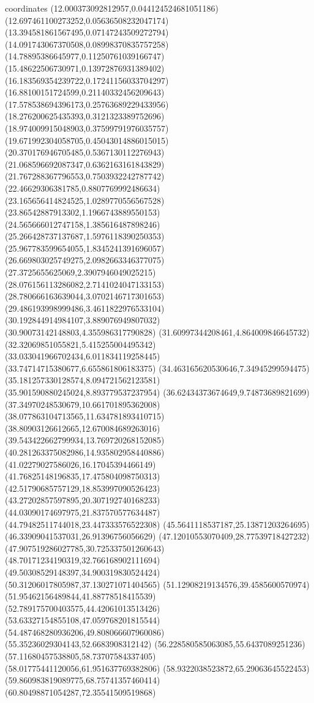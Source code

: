 coordinates {%
(12.000373092812957,0.044124524681051186)
(12.697461100273252,0.05636508232047174)
(13.394581861567495,0.07147243509272794)
(14.091743067370508,0.08998370835757258)
(14.78895386645977,0.11250761039166747)
(15.48622506730971,0.13972876931389402)
(16.183569354239722,0.17241156033704297)
(16.88100151724599,0.21140332456209643)
(17.578538694396173,0.25763689229433956)
(18.276200625435393,0.3121323389752696)
(18.974009915048903,0.37599791976035757)
(19.671992304058705,0.45043014886015015)
(20.370176946705485,0.5367130112276943)
(21.068596692087347,0.6362163161843829)
(21.767288367796553,0.7503932242787742)
(22.46629306381785,0.8807769992486634)
(23.165656414824525,1.0289770556567528)
(23.86542887913302,1.1966743889550153)
(24.565666012747158,1.385616487898246)
(25.266428737137687,1.5976118390250353)
(25.967783599654055,1.8345241391696057)
(26.669803025749275,2.0982663346377075)
(27.3725655625069,2.3907946049025215)
(28.076156113286082,2.7141024047133153)
(28.780666163639044,3.0702146717301653)
(29.486193998999486,3.4611822976533104)
(30.192844914984107,3.889076949807032)
(30.90073142148803,4.355986317790828)
(31.60997344208461,4.864009846645732)
(32.32069851055821,5.415255004495342)
(33.033041966702434,6.011834119258445)
(33.74714715380677,6.655861806183375)
(34.463165620530646,7.34945299594475)
(35.181257330128574,8.094721562123581)
(35.901590880245024,8.893779537237954)
(36.62434373674649,9.74873689821699)
(37.34970248530679,10.661701895362008)
(38.077863104713565,11.634781893410715)
(38.80903126612665,12.670084689263016)
(39.543422662799934,13.769720268152085)
(40.281263375082986,14.935802958440886)
(41.02279027586026,16.17045394466149)
(41.76825148196835,17.475804098750313)
(42.51790685757129,18.853997090526423)
(43.27202857597895,20.307192740168233)
(44.03090174697975,21.837570577634487)
(44.79482511744018,23.447333576522308)
(45.5641118537187,25.13871203264695)
(46.33909041537031,26.91396756056629)
(47.12010553070409,28.77539718427232)
(47.907519286027785,30.725337501260643)
(48.70171234190319,32.766168902111694)
(49.50308529148397,34.900319830524424)
(50.31206017805987,37.130271071404565)
(51.12908219134576,39.4585600570974)
(51.95462156489844,41.88778518415539)
(52.789175700403575,44.42061013513426)
(53.63327154855108,47.059768201815544)
(54.487468280936206,49.808066607960086)
(55.35236029304143,52.6683908312142)
(56.228580585063085,55.6437089251236)
(57.11680457538805,58.73707584337405)
(58.01775441120056,61.951637769382806)
(58.9322038523872,65.29063645522453)
(59.860983819089775,68.75741357460414)
(60.80498871054287,72.35541509519868)
}
